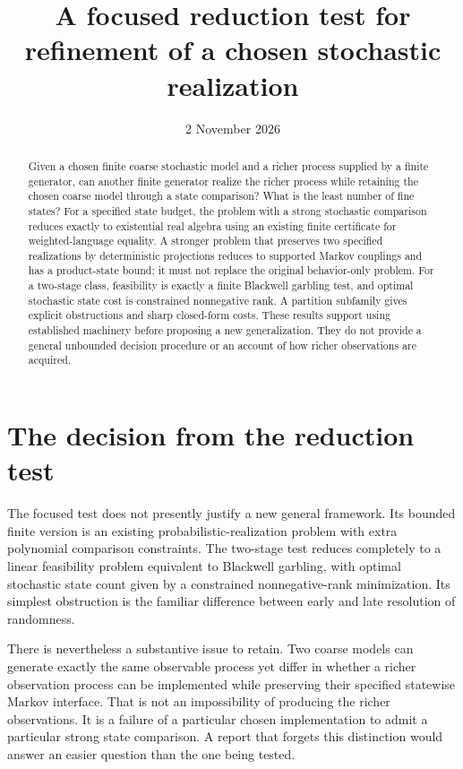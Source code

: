 \documentclass[11pt]{article}
\title{A focused reduction test for refinement of a chosen stochastic realization}
\author{}
\date{2 November 2026}
\begin{document}
\maketitle
\begin{abstract}
Given a chosen finite coarse stochastic model and a richer process supplied by a finite generator, can another finite generator realize the richer process while retaining the chosen coarse model through a state comparison? What is the least number of fine states? For a specified state budget, the problem with a strong stochastic comparison reduces exactly to existential real algebra using an existing finite certificate for weighted-language equality. A stronger problem that preserves two specified realizations by deterministic projections reduces to supported Markov couplings and has a product-state bound; it must not replace the original behavior-only problem. For a two-stage class, feasibility is exactly a finite Blackwell garbling test, and optimal stochastic state cost is constrained nonnegative rank. A partition subfamily gives explicit obstructions and sharp closed-form costs. These results support using established machinery before proposing a new generalization. They do not provide a general unbounded decision procedure or an account of how richer observations are acquired.
\end{abstract}

\section{The decision from the reduction test}

The focused test does not presently justify a new general framework. Its bounded finite version is an existing probabilistic-realization problem with extra polynomial comparison constraints. The two-stage test reduces completely to a linear feasibility problem equivalent to Blackwell garbling, with optimal stochastic state count given by a constrained nonnegative-rank minimization. Its simplest obstruction is the familiar difference between early and late resolution of randomness.

There is nevertheless a substantive issue to retain. Two coarse models can generate exactly the same observable process yet differ in whether a richer observation process can be implemented while preserving their specified statewise Markov interface. That is not an impossibility of producing the richer observations. It is a failure of a particular chosen implementation to admit a particular strong state comparison. A report that forgets this distinction would answer an easier question than the one being tested.
\end{document}
